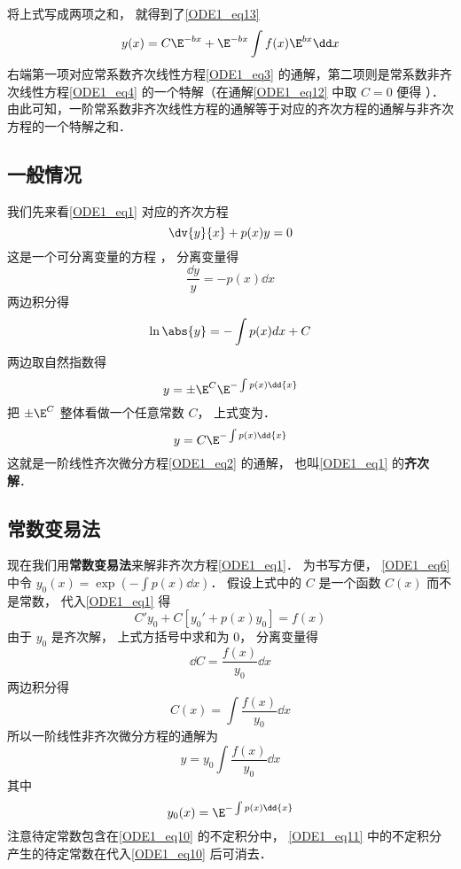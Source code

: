 将上式写成两项之和， 就得到了\autoref{ODE1_eq13}
\begin{equation}
y(x)=C\E^{-bx}+\E^{-bx}\int f(x)\E^{bx}\dd x
\end{equation}
右端第一项对应常系数齐次线性方程\autoref{ODE1_eq3} 的通解，第二项则是常系数非齐次线性方程\autoref{ODE1_eq4} 的一个特解（在通解\autoref{ODE1_eq12} 中取 $C=0$ 便得 ）．由此可知，一阶常系数非齐次线性方程的通解等于对应的齐次方程的通解与非齐次方程的一个特解之和．

\subsection{一般情况}
我们先来看\autoref{ODE1_eq1} 对应的齐次方程
\begin{equation}\label{ODE1_eq2}
\dv{y}{x} + p(x)y = 0
\end{equation}
这是一个可分离变量的方程%
， 分离变量得
\begin{equation}
\frac{\dd{y}}{y} = -p(x) \dd{x}
\end{equation}
两边积分得
\begin{equation}
\ln\abs{y} = -\int p(x) dx + C
\end{equation}
两边取自然指数得
\begin{equation}
y = \pm \E^C \E^{-\int p(x) \dd{x}}
\end{equation}
把 $\pm \E^C $ 整体看做一个任意常数 $C$， 上式变为．
\begin{equation}\label{ODE1_eq6}
y = C \E^{-\int p(x) \dd{x}}
\end{equation}
这就是一阶线性齐次微分方程\autoref{ODE1_eq2} 的通解， 也叫\autoref{ODE1_eq1} 的\textbf{齐次解}．

\subsection{常数变易法}

现在我们用\textbf{常数变易法}来解非齐次方程\autoref{ODE1_eq1}． 为书写方便， \autoref{ODE1_eq6} 中令 $y_0(x) = \exp(-\int p(x) \dd{x})$． 假设上式中的 $C$ 是一个函数 $C(x)$ 而不是常数， 代入\autoref{ODE1_eq1} 得
\begin{equation}
C'y_0 + C[y_0' + p(x)y_0] = f(x)
\end{equation}
由于 $y_0$ 是齐次解， 上式方括号中求和为 0， 分离变量得
\begin{equation}
\dd{C}= \frac{f(x)}{y_0} \dd{x}
\end{equation}
两边积分得
\begin{equation}
C(x) = \int \frac{f(x)}{y_0} \dd{x}
\end{equation}
所以一阶线性非齐次微分方程的通解为
\begin{equation}\label{ODE1_eq10}
y = y_0  \int \frac{f(x)}{y_0} \dd{x}
\end{equation}
其中
\begin{equation}\label{ODE1_eq11}
y_0(x) = \E^{-\int p(x) \dd{x}}
\end{equation}
注意待定常数包含在\autoref{ODE1_eq10} 的不定积分中， \autoref{ODE1_eq11} 中的不定积分产生的待定常数在代入\autoref{ODE1_eq10} 后可消去．
